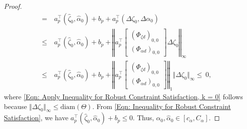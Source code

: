 \documentclass[letterpaper, 10 pt, conference]{ieeeconf}
\newcommand{\?}{\stackrel{?}{=}}
\newcommand{\paramSet}{\Theta}
\newcommand{\ratePGDNominal}{\hat\ratePGD}
\newcommand{\ratePGDError}{\Delta\ratePGD}
\newcommand{\disturbance}{d}
\newcommand{\ratePGD}{\alpha}
\newcommand{\ratePGDMin}{c_\ratePGD}
\newcommand{\ratePGDMax}{C_\ratePGD}
\newcommand{\systemResponse}{\Phi}
\newcommand{\state}{\zeta}
\newcommand{\stateNominal}{\hat\state}
\newcommand{\stateError}{\Delta\state}
\newcommand{\diam}{\text{diam}}
\newcommand{\ratePGDBoundSlope}{a}
\newcommand{\ratePGDBoundOffset}{b}
\begin{document}
\begin{proof}
{\begin{align}
    = \ &\ratePGDBoundSlope_p^\top (\stateNominal_0, \ratePGDNominal_0) + \ratePGDBoundOffset_p + \ratePGDBoundSlope_p^\top (\stateError_0, \ratePGDError_0) \\ \label{Eqn: Apply Inequality for Robust Constraint Satisfaction, k = 0}
    \leq \ &\ratePGDBoundSlope_p^\top (\stateNominal_0, \ratePGDNominal_0) + \ratePGDBoundOffset_p + 
    \left\Vert 
    \ratePGDBoundSlope_p^\top
    \begin{bmatrix}
        (\systemResponse_{\state \disturbance})_{0, 0} \\
        (\systemResponse_{\ratePGD \disturbance})_{0, 0}
    \end{bmatrix}
    \stateError_0
    \right\Vert_\infty\\ 
    \leq \ &\ratePGDBoundSlope_p^\top (\stateNominal_0, \ratePGDNominal_0) + \ratePGDBoundOffset_p + 
    \left\Vert 
    \ratePGDBoundSlope_p^\top
    \begin{bmatrix}
        (\systemResponse_{\state \disturbance})_{0, 0} \\
        (\systemResponse_{\ratePGD \disturbance})_{0, 0}
    \end{bmatrix}
    \right\Vert_1
    \Vert \stateError_0 \Vert_\infty \leq \ 0,\nonumber
\end{align}
}
\hspace{-1mm}where \eqref{Eqn: Apply Inequality for Robust Constraint Satisfaction, k = 0} follows because $\Vert \stateError_0 \Vert_\infty \leq \diam(\paramSet)$.
From \eqref{Eqn: Inequality for Robust Constraint Satisfaction}, we have $\ratePGDBoundSlope_p^\top (\stateNominal_0, \ratePGDNominal_0) + \ratePGDBoundOffset_p \leq 0$.
Thus, $\ratePGD_0, \ratePGDNominal_0 \in [\ratePGDMin, \ratePGDMax]$. 


\end{proof}
\end{document}
